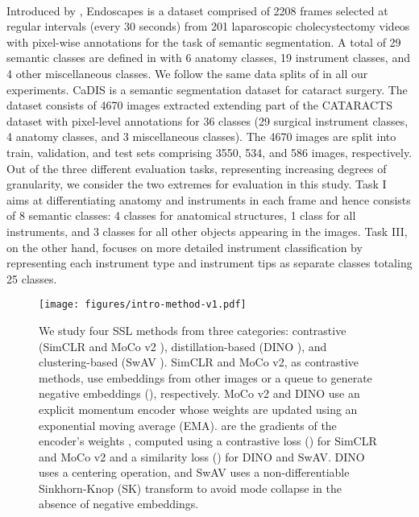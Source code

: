 \documentclass[times,twocolumn,final]{elsarticle}
\begin{document}
{\\
 Introduced by \cite{endoscapes}, Endoscapes is a dataset comprised of 2208 frames selected at regular intervals (every 30 seconds) from 201 laparoscopic cholecystectomy videos with pixel-wise annotations for the task of semantic segmentation. A total of 29 semantic classes are defined in \cite{endoscapes} with 6 anatomy classes, 19 instrument classes, and 4 other miscellaneous classes. We follow the same data splits of \cite{endoscapes} in all our experiments.
 CaDIS \citep{cadis} is a semantic segmentation dataset for cataract surgery. The dataset consists of 4670 images extracted extending part of the CATARACTS dataset with pixel-level annotations for 36 classes (29 surgical instrument classes, 4 anatomy classes, and 3 miscellaneous classes). The 4670 images are split into train, validation, and test sets comprising 3550, 534, and 586 images, respectively. Out of the three different evaluation tasks, representing increasing degrees of granularity, we consider the two extremes for evaluation in this study. Task I aims at differentiating anatomy and instruments in each frame and hence consists of 8 semantic classes: 4 classes for anatomical structures, 1 class for all instruments, and 3 classes for all other objects appearing in the images. Task III, on the other hand, focuses on more detailed instrument classification by representing each instrument type and instrument tips as separate classes totaling 25 classes.}
\\
\begin{figure*}[t!]
\texttt{[image: figures/intro-method-v1.pdf]}
\caption{We study four SSL methods from three categories: contrastive (SimCLR \citep{chen2020simple} and MoCo v2 \citep{he2020momentum,chen2020improved}), distillation-based (DINO \citep{caron2021emerging}), and clustering-based (SwAV \citep{caron2020unsupervised}). SimCLR and MoCo v2, as contrastive methods, use embeddings from other images or a queue to generate negative embeddings (), respectively. MoCo v2 and DINO use an explicit momentum encoder whose weights are updated using an exponential moving average (EMA).  are the gradients of the encoder's weights , computed using a contrastive loss () for SimCLR and MoCo v2 and a similarity loss () for DINO and SwAV. DINO uses a centering operation, and SwAV uses a non-differentiable Sinkhorn-Knop (SK) transform \citep{Cuturi13} to avoid mode collapse in the absence of negative embeddings.}
\label{fig:intro-methods}
\end{figure*}
\end{document}

